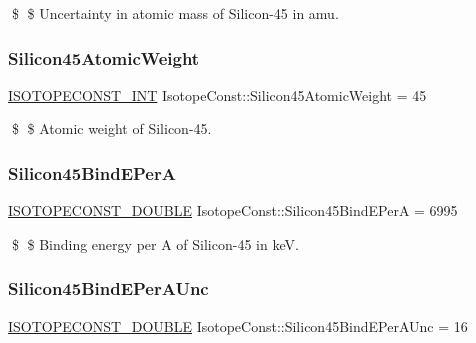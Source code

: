 \$ \$ Uncertainty in atomic mass of Silicon-\/45 in amu. \mbox{\label{group___isotope_const-_silicon-_si45_ga7bfc811821704756388b8378f0e18954}} 
\subsubsection{\texorpdfstring{Silicon45\+Atomic\+Weight}{Silicon45AtomicWeight}}
{\footnotesize\ttfamily \mbox{\hyperlink{group___isotope_const-_macros_ga5f18360b3e99483a35c32d789e62621c}{I\+S\+O\+T\+O\+P\+E\+C\+O\+N\+S\+T\+\_\+\+I\+NT}} Isotope\+Const\+::\+Silicon45\+Atomic\+Weight = 45}

\$ \$ Atomic weight of Silicon-\/45. \mbox{\label{group___isotope_const-_silicon-_si45_ga62887039500acbc99b9a44725eab55fe}} 
\subsubsection{\texorpdfstring{Silicon45\+Bind\+E\+PerA}{Silicon45BindEPerA}}
{\footnotesize\ttfamily \mbox{\hyperlink{group___isotope_const-_macros_ga8f45a7272ce02c0b4c65c44636ed719a}{I\+S\+O\+T\+O\+P\+E\+C\+O\+N\+S\+T\+\_\+\+D\+O\+U\+B\+LE}} Isotope\+Const\+::\+Silicon45\+Bind\+E\+PerA = 6995}

\$ \$ Binding energy per A of Silicon-\/45 in keV. \mbox{\label{group___isotope_const-_silicon-_si45_ga9ed1932c85337c80ddd1479105d0c0bf}} 
\subsubsection{\texorpdfstring{Silicon45\+Bind\+E\+Per\+A\+Unc}{Silicon45BindEPerAUnc}}
{\footnotesize\ttfamily \mbox{\hyperlink{group___isotope_const-_macros_ga8f45a7272ce02c0b4c65c44636ed719a}{I\+S\+O\+T\+O\+P\+E\+C\+O\+N\+S\+T\+\_\+\+D\+O\+U\+B\+LE}} Isotope\+Const\+::\+Silicon45\+Bind\+E\+Per\+A\+Unc = 16}

